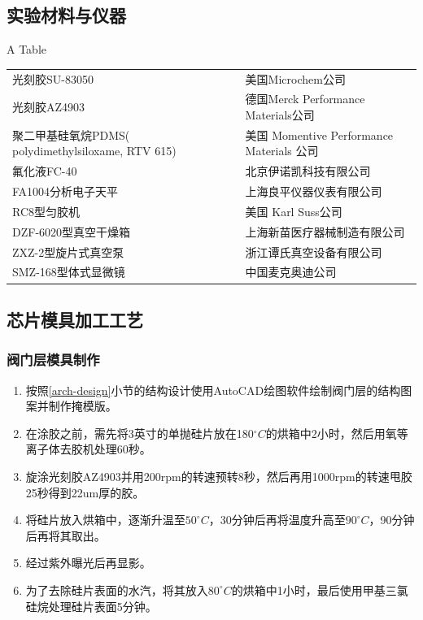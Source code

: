 \subsection{实验材料与仪器}
	\begin{table}[htbp]
	\centering
    {A Table}
	\begin{tabular}{p{150pt}p{230pt}}
	\toprule
		光刻胶SU-83050 & 美国Microchem公司\\
		光刻胶AZ4903 & 德国Merck Performance Materials公司\\
		聚二甲基硅氧烷PDMS( polydimethylsiloxame, RTV 615) &美国 Momentive Performance Materials 公司\\
		氟化液FC-40 & 北京伊诺凯科技有限公司\\
		FA1004分析电子天平 & 上海良平仪器仪表有限公司\\
		RC8型匀胶机 & 美国 Karl Suss公司\\
		DZF-6020型真空干燥箱& 上海新苗医疗器械制造有限公司\\
		ZXZ-2型旋片式真空泵 & 浙江谭氏真空设备有限公司\\
		SMZ-168型体式显微镜& 中国麦克奥迪公司 \\
	\bottomrule
	\end{tabular}
	\end{table}
\subsection{芯片模具加工工艺}
\subsubsection{阀门层模具制作}
	
	\begin{enumerate}[label={\alph*)},font={\color{black!50!black}\bfseries}]
	\item 按照\ref{arch-design}小节的结构设计使用AutoCAD绘图软件绘制阀门层的结构图案并制作掩模版。
	\item 在涂胶之前，需先将3英寸的单抛硅片放在180$^\circ C$的烘箱中2小时，然后用氧等离子体去胶机处理60秒。
	\item 旋涂光刻胶AZ4903并用200rpm的转速预转8秒，然后再用1000rpm的转速甩胶25秒得到22um厚的胶。
	\item 将硅片放入烘箱中，逐渐升温至$50^\circ C$，30分钟后再将温度升高至$90^\circ C$，90分钟后再将其取出。
	\item 经过紫外曝光后再显影。
	\item 为了去除硅片表面的水汽，将其放入$80^\circ C$的烘箱中1小时，最后使用甲基三氯硅烷处理硅片表面5分钟。
	\end{enumerate}
	
